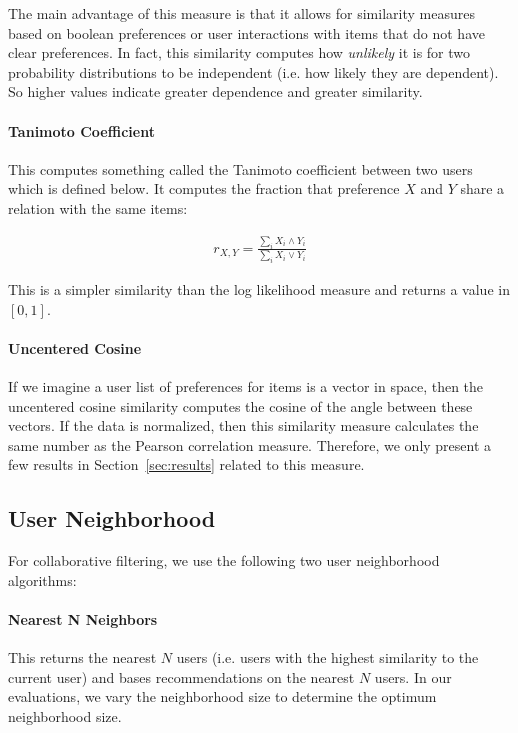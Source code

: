 \documentclass{article}
\begin{document}
The main advantage of this measure is that it allows for similarity measures based on boolean preferences or user
interactions with items that do not have clear preferences. In fact, this similarity computes how \emph{unlikely} it is
for two probability distributions to be independent (i.e. how likely they are dependent). So higher values indicate 
greater dependence and greater similarity.

\paragraph{Tanimoto Coefficient}

This computes something called the Tanimoto coefficient between two users which is defined below. It computes the
fraction that preference $X$ and $Y$ share a relation with the same items:

\begin{align*}
r_{X, Y} = \frac{\sum_i X_i \wedge Y_i}{\sum_i X_i \vee Y_i}
\end{align*}

This is a simpler similarity than the log likelihood measure and returns a value in $[0, 1]$. 

\paragraph{Uncentered Cosine}

If we imagine a user list of preferences for items is a vector in space, then the uncentered cosine similarity computes
the cosine of the angle between these vectors. If the data is normalized, then this similarity measure calculates the
same number as the Pearson correlation measure. Therefore, we only present a few results in Section~\ref{sec:results} related to this measure.

\subsection{User Neighborhood}

For collaborative filtering, we use the following two user neighborhood algorithms:

\paragraph{Nearest N Neighbors} This returns the nearest $N$ users (i.e. users with the highest similarity to the current
user) and bases recommendations on the nearest $N$ users. In our evaluations, we vary the neighborhood size to 
determine the optimum neighborhood size. 
\end{document}
